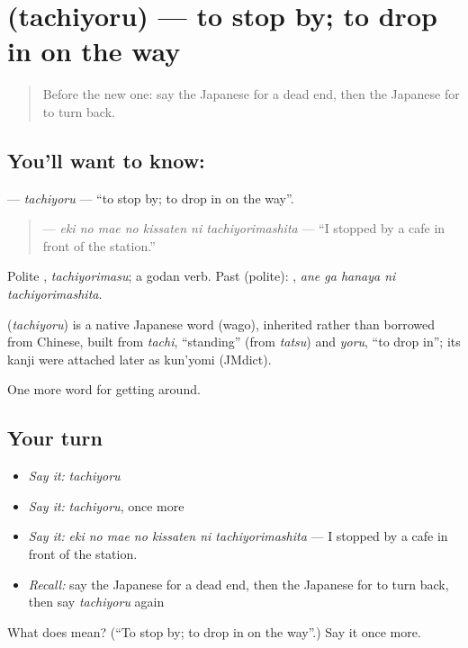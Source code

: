 \section[\texorpdfstring{\ja{たちよる} (tachiyoru)}{たちよる (tachiyoru)}]{ (tachiyoru) — to stop by; to drop in on the way}

\label{lesson:JA-C392-tachiyoru}



\begin{quote}
Before the new one: say the Japanese for a dead end, then the Japanese for to turn back.
\end{quote}

\subsection*{You'll want to know: }
\textbf{} — \emph{tachiyoru} — \textquotedblleft{}to stop by; to drop in on the way\textquotedblright{}.

\begin{quote}
\textbf{   } — \emph{eki no mae no kissaten ni tachiyorimashita} — \textquotedblleft{}I stopped by a cafe in front of the station.\textquotedblright{}
\end{quote}

Polite \textbf{}, \emph{tachiyorimasu}; a godan verb. Past (polite): \textbf{  }, \emph{ane ga hanaya ni tachiyorimashita}.

\begin{cousinweb}
\textbf{} (\emph{tachiyoru}) is a native Japanese word (wago), inherited rather than borrowed from Chinese, built from \emph{tachi}, \textquotedblleft{}standing\textquotedblright{} (from \emph{tatsu}) and \emph{yoru}, \textquotedblleft{}to drop in\textquotedblright{}; its kanji were attached later as kun'yomi (JMdict).
\end{cousinweb}

\begin{grammarlens}[title={What you've built}]
One more word for getting around.
\end{grammarlens}

\subsection*{Your turn}
\begin{itemize}
\raggedright
  \item \emph{Say it:} \emph{tachiyoru}
  \item \emph{Say it:} \emph{tachiyoru}, once more
  \item \emph{Say it:} \emph{eki no mae no kissaten ni tachiyorimashita} — I stopped by a cafe in front of the station.
  \item \emph{Recall:} say the Japanese for a dead end, then the Japanese for to turn back, then say \emph{tachiyoru} again
\end{itemize}

\begin{tcolorbox}[breakable,colback=teal!4,colframe=teal!35!black,title={Before you move on}]
What does  mean? (\textquotedblleft{}To stop by; to drop in on the way\textquotedblright{}.) Say it once more.
\end{tcolorbox}
